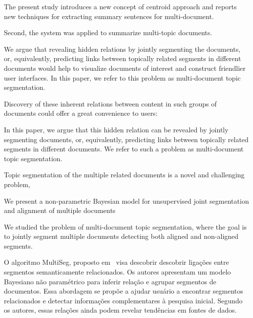 
The present study introduces a new concept of centroid approach and reports new techniques for extracting summary sentences for multi-document.


Second, the system was applied to summarize multi-topic documents.











We argue that revealing hidden
relations by jointly segmenting the documents, or, equivalently, 
predicting links between topically related segments in
different documents would help to visualize documents of interest 
and construct friendlier user interfaces. In this paper,
we refer to this problem as multi-document topic segmentation.




Discovery of these inherent relations between content in such
groups of documents could offer a great convenience to users:


In this paper, we argue that this hidden relation 
can be revealed by jointly segmenting documents, or,
equivalently, predicting links between topically related segments 
in different documents. We refer to such a problem
as multi-document topic segmentation.



Topic segmentation of the multiple related documents is
a novel and challenging problem,


We present a non-parametric Bayesian model for unsupervised 
joint segmentation and alignment of multiple documents


We studied the problem of multi-document topic segmentation, 
where the goal is to jointly segment multiple documents 
detecting both aligned and non-aligned segments.




O algoritmo MultiSeg, proposto em~\cite{} visa descobrir descobrir ligações entre segmentos semanticamente relacionados. Os autores apresentam um modelo Bayesiano não paramétrico para inferir relação e agrupar segmentos de documentos. Essa abordagem se propõe a ajudar usuário a encontrar segmentos relacionados e detectar informações complementares à pesquisa inicial. Segundo os autores, essas relações ainda podem revelar tendências em fontes de dados.



